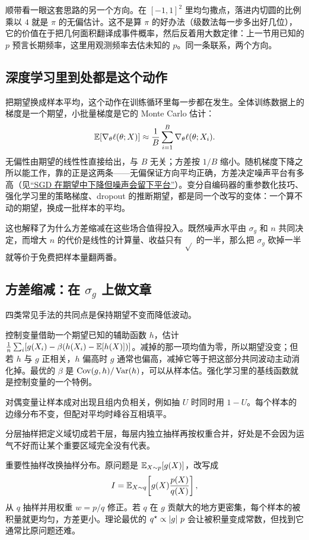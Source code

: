 顺带看一眼这套思路的另一个方向。在 \([-1,1]^2\) 里均匀撒点，落进内切圆的比例乘以 \(4\) 就是 \(\pi\) 的无偏估计。这不是算 \(\pi\) 的好办法（级数法每一步多出好几位），它的价值在于把几何面积翻译成事件概率，然后反着用大数定律：上一节用已知的 \(p\) 预言长期频率，这里用观测频率去估未知的 \(p\)。同一条联系，两个方向。

\subsection{深度学习里到处都是这个动作}

把期望换成样本平均，这个动作在训练循环里每一步都在发生。全体训练数据上的梯度是一个期望，小批量梯度是它的 Monte Carlo 估计：
\[
\mathbb{E}[\nabla_\theta\ell(\theta;X)]\approx\frac1B\sum_{i=1}^B\nabla_\theta\ell(\theta;X_i).
\]
无偏性由期望的线性性直接给出，与 \(B\) 无关；方差按 \(1/B\) 缩小。随机梯度下降之所以能工作，靠的正是这两条——无偏保证方向平均正确，方差决定噪声平台有多高（见\hyperref[sec:09-Convex-Optimization/08-Nonconvex-and-Stochastic-Optimization/04]{``SGD 在期望中下降但噪声会留下平台''}）。变分自编码器的重参数化技巧、强化学习里的策略梯度、dropout 的推断期望，都是同一个改写的变体：一个算不动的期望，换成一批样本的平均。

这也解释了为什么方差缩减在这些场合值得投入。既然噪声水平由 \(\sigma_g\) 和 \(n\) 共同决定，而增大 \(n\) 的代价是线性的计算量、收益只有 \(\sqrt{}\) 的一半，那么把 \(\sigma_g\) 砍掉一半就等价于免费把样本量翻两番。

\subsection{方差缩减：在 \texorpdfstring{\(\sigma_g\)}{sigma} 上做文章}

四类常见手法的共同点是保持期望不变而降低波动。

控制变量借助一个期望已知的辅助函数 \(h\)，估计
\(\frac1n\sum_i[g(X_i)-\beta(h(X_i)-\mathbb{E}[h(X)])]\)。减掉的那一项均值为零，所以期望没变；但若 \(h\) 与 \(g\) 正相关，\(h\) 偏高时 \(g\) 通常也偏高，减掉它等于把这部分共同波动主动消化掉。最优的 \(\beta\) 是 \(\operatorname{Cov}(g,h)/\operatorname{Var}(h)\)，可以从样本估。强化学习里的基线函数就是控制变量的一个特例。

对偶变量让样本成对出现且组内负相关，例如抽 \(U\) 时同时用 \(1-U\)。每个样本的边缘分布不变，但配对平均时峰谷互相填平。

分层抽样把定义域切成若干层，每层内独立抽样再按权重合并，好处是不会因为运气不好而让某个重要区域完全没有代表。

重要性抽样改换抽样分布。原问题是 \(\mathbb{E}_{X\sim p}[g(X)]\)，改写成
\[
I=\mathbb{E}_{X\sim q}\!\left[g(X)\frac{p(X)}{q(X)}\right],
\]
从 \(q\) 抽样并用权重 \(w=p/q\) 修正。若 \(q\) 在 \(g\) 贡献大的地方更密集，每个样本的被积量就更均匀，方差更小。理论最优的 \(q^\star\propto\left|g\right|\,p\) 会让被积量变成常数，但找到它通常比原问题还难。

